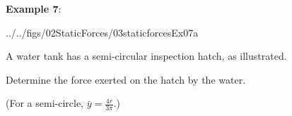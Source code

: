 \documentclass[10pt,onesided]{amsart}
\begin{document}
\begin{minipage}[t]{0.45\textwidth}
	\textbf{Example 7}:\\
	\begin{cfig}[0.35]{../../figs/02StaticForces/03staticforcesEx07a}\end{cfig}
	\raggedright
	A water tank has a semi-circular inspection hatch, as illustrated.
	\par\smallskip
	Determine the force exerted on the hatch by the water. \par
	\begin{center}
		(For a semi-circle, $\bar{y}=\frac{4r}{3\pi}$.)
	\end{center}
\end{minipage}
\end{document}
